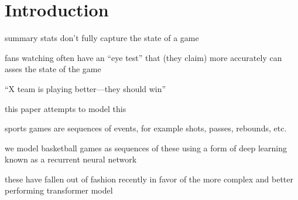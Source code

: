 \section{Introduction}

summary stats don't fully capture the state of a game

fans watching often have an ``eye test'' that (they claim) more accurately can asses the state of the game

``X team is playing better---they should win''

this paper attempts to model this

sports games are sequences of events, for example shots, passes, rebounds, etc.

we model basketball games as sequences of these using a form of deep learning known as a recurrent neural network

these have fallen out of fashion recently in favor of the more complex and better performing transformer model

